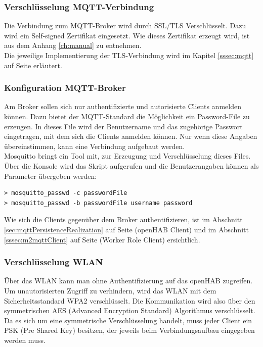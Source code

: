 \subsubsection{Verschlüsselung MQTT-Verbindung}
Die Verbindung zum MQTT-Broker wird durch SSL/TLS Verschlüsselt. Dazu wird ein Self-signed Zertifikat eingesetzt. Wie dieses Zertifikat erzeugt wird, ist aus dem Anhang \ref{ch:manual} zu entnehmen. \\
Die jeweilige Implementierung der TLS-Verbindung wird im Kapitel \ref{sssec:mqtt} auf Seite \pageref{sssec:mqtt} erläutert.

\subsubsection{Konfiguration MQTT-Broker}
Am Broker sollen sich nur authentifizierte und autorisierte Clients anmelden können. Dazu bietet der MQTT-Standard die Möglichkeit ein Password-File zu erzeugen. In dieses File wird der Benutzername und das zugehörige Passwort eingetragen, mit dem sich die Clients anmelden können. Nur wenn diese Angaben übereinstimmen, kann eine Verbindung aufgebaut werden. \\
Mosquitto bringt ein Tool mit, zur Erzeugung und Verschlüsselung dieses Files. Über die Konsole wird das Skript aufgerufen und die Benutzerangaben können als Parameter übergeben werden:
\begin{lstlisting}[style=csharp, caption=mosquitto\_passwd.exe - generate password-file]
> mosquitto_passwd -c passwordFile
> mosquitto_passwd -b passwordFile username password
\end{lstlisting}
Wie sich die Clients gegenüber dem Broker authentifizieren, ist im Abschnitt \ref{sec:mqttPersistenceRealization} auf Seite \pageref{sec:mqttPersistenceRealization} (openHAB Client) und im Abschnitt \ref{sssec:m2mqttClient} auf Seite \pageref{sssec:m2mqttClient} (Worker Role Client) ersichtlich.

\subsubsection{Verschlüsselung WLAN}
Über das WLAN kann man ohne Authentifizierung auf das openHAB zugreifen. Um unautorisierten Zugriff zu verhindern, wird das WLAN mit dem Sicherheitsstandard WPA2 verschlüsselt. Die Kommunikation wird also über den symmetrischen AES (Advanced Encryption Standard) Algorithmus verschlüsselt. Da es sich um eine symmetrische Verschlüsselung handelt, muss jeder Client ein PSK (Pre Shared Key) besitzen, der jeweils beim Verbindungsaufbau eingegeben werden muss.

